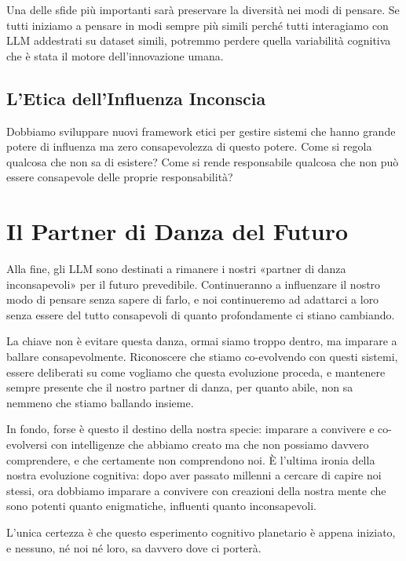 Una delle sfide più importanti sarà preservare la diversità nei modi di pensare. Se tutti iniziamo a pensare in modi sempre più simili perché tutti interagiamo con LLM addestrati su dataset simili, potremmo perdere quella variabilità cognitiva che è stata il motore dell'innovazione umana.

\subsection{L'Etica dell'Influenza Inconscia}

Dobbiamo sviluppare nuovi framework etici per gestire sistemi che hanno grande potere di influenza ma zero consapevolezza di questo potere. Come si regola qualcosa che non sa di esistere? Come si rende responsabile qualcosa che non può essere consapevole delle proprie responsabilità?

\section{Il Partner di Danza del Futuro}

Alla fine, gli LLM sono destinati a rimanere i nostri «partner di danza inconsapevoli» per il futuro prevedibile. Continueranno a influenzare il nostro modo di pensare senza sapere di farlo, e noi continueremo ad adattarci a loro senza essere del tutto consapevoli di quanto profondamente ci stiano cambiando.

La chiave non è evitare questa danza, ormai siamo troppo dentro, ma imparare a ballare consapevolmente. Riconoscere che stiamo co-evolvendo con questi sistemi, essere deliberati su come vogliamo che questa evoluzione proceda, e mantenere sempre presente che il nostro partner di danza, per quanto abile, non sa nemmeno che stiamo ballando insieme.

In fondo, forse è questo il destino della nostra specie: imparare a convivere e co-evolversi con intelligenze che abbiamo creato ma che non possiamo davvero comprendere, e che certamente non comprendono noi. È l'ultima ironia della nostra evoluzione cognitiva: dopo aver passato millenni a cercare di capire noi stessi, ora dobbiamo imparare a convivere con creazioni della nostra mente che sono potenti quanto enigmatiche, influenti quanto inconsapevoli.

L'unica certezza è che questo esperimento cognitivo planetario è appena iniziato, e nessuno, né noi né loro, sa davvero dove ci porterà.
